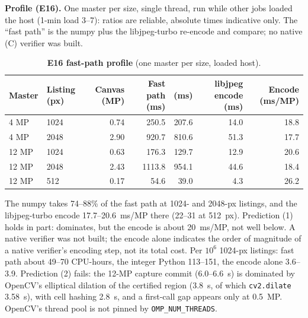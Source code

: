 \documentclass[10pt]{article}
\begin{document}
\textbf{Profile (E16).} One master per size, single thread, run while other jobs loaded the host (1-min load 3--7):
ratios are reliable, absolute times indicative only. The ``fast path'' is the numpy \Compile{} plus the libjpeg-turbo
re-encode and compare; no native (C) verifier was built.
\begin{table}[!htbp]
\centering\tabsize
\caption{\textbf{E16 fast-path profile} (one master per size, loaded host).}
\label{tab:x4}
\begin{tabular}{@{}llrrrrr@{}}
\toprule
Master & Listing (px) & Canvas (MP) & Fast path (ms) & \Compile{} (ms) & libjpeg encode (ms) & Encode (ms/MP) \\
\midrule
4 MP & 1024 & 0.74 & 250.5 & 207.6 & 14.0 & 18.8 \\
4 MP & 2048 & 2.90 & 920.7 & 810.6 & 51.3 & 17.7 \\
12 MP & 1024 & 0.63 & 176.3 & 129.7 & 12.9 & 20.6 \\
12 MP & 2048 & 2.43 & 1113.8 & 954.1 & 44.6 & 18.4 \\
12 MP & 512 & 0.17 & 54.6 & 39.0 & 4.3 & 26.2 \\
\bottomrule
\end{tabular}
\end{table}
The numpy \Compile{} takes 74--88\% of the fast path at 1024- and 2048-px listings, and the libjpeg-turbo encode
17.7--20.6~ms/MP there (22--31 at 512~px). Prediction (1) holds in part: \Compile{} dominates, but the encode is about
20~ms/MP, not well below. A native verifier was not built; the encode alone indicates the order of magnitude of a native
verifier's encoding step, not its total cost. Per $10^6$ 1024-px listings: fast path about 49--70 CPU-hours, the integer Python \VerifyE{} 113--151, the encode
alone 3.6--3.9. Prediction (2) fails: the 12-MP capture commit (6.0--6.6~s) is dominated by OpenCV's elliptical dilation of the
certified region (3.8~s, of which \texttt{cv2.dilate} 3.58~s), with cell hashing 2.8~s, and a first-call gap appears
only at 0.5~MP. OpenCV's thread pool is not pinned by \texttt{OMP\_NUM\_THREADS}.
\end{document}
